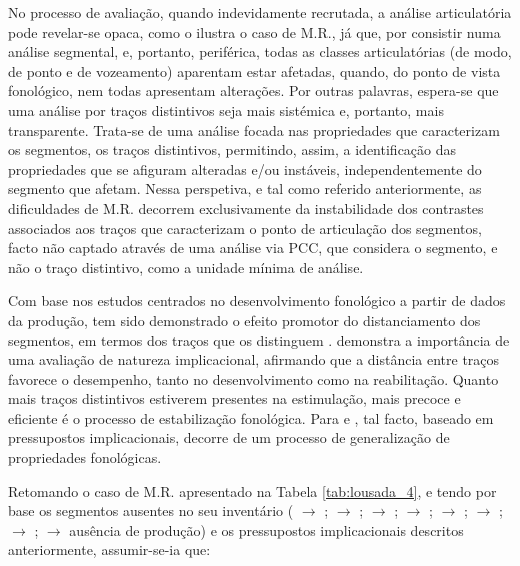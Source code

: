\documentclass[output=paper]{LSP/langsci}
\begin{document}
No processo de avaliação, quando indevidamente recrutada, a análise articulatória pode revelar-se opaca, como o ilustra o caso de M.R., já que, por consistir numa análise segmental, e, portanto, periférica, todas as classes articulatórias (de modo, de ponto e de vozeamento) aparentam estar afetadas, quando, do ponto de vista fonológico, nem todas apresentam alterações. Por outras palavras, espera-se que uma análise por traços distintivos seja mais sistémica e, portanto, mais transparente. Trata-se de uma análise focada nas propriedades que caracterizam os segmentos, os traços distintivos, permitindo, assim, a identificação das propriedades que se afiguram alteradas e/ou instáveis, independentemente do segmento que afetam. Nessa perspetiva, e tal como referido anteriormente, as dificuldades de M.R. decorrem exclusivamente da instabilidade dos contrastes associados aos traços que caracterizam o ponto de articulação dos segmentos, facto não captado através de uma análise via PCC, que considera o segmento, e não o traço distintivo, como a unidade mínima de análise.

Com base nos estudos centrados no desenvolvimento fonológico a partir de dados da produção, tem sido demonstrado o efeito promotor do distanciamento dos segmentos, em termos dos traços que os distinguem \citep{lamprecht_etal2004,lazzarottovolcao2009,mota1996}. \citet{mota1996,mota1997} demonstra a importância de uma avaliação de natureza implicacional, afirmando que a distância entre traços favorece o desempenho, tanto no desenvolvimento como na reabilitação. Quanto mais traços distintivos estiverem presentes na estimulação, mais precoce e eficiente é o processo de estabilização fonológica. Para \citet{mota1996,mota1997} e \citet{motapereira2001}, tal facto, baseado em pressupostos implicacionais, decorre de um processo de generalização de propriedades fonológicas.


Retomando o caso de M.R. apresentado na Tabela \ref{tab:lousada_4}, e tendo por base os segmentos ausentes no seu inventário ( $\rightarrow$ \ipa{[s]};  $\rightarrow$ \ipa{[z]};  $\rightarrow$ \ipa{[t]};  $\rightarrow$ \ipa{[n]};  $\rightarrow$ \ipa{[l]};  $\rightarrow$ \ipa{[b]};  $\rightarrow$ \ipa{[b]};  $\rightarrow$ ausência de produção) e os pressupostos implicacionais descritos anteriormente, assumir-se-ia que:
\end{document}

